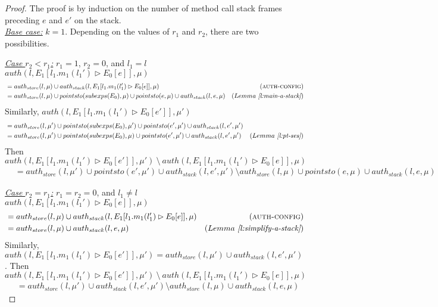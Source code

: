 \documentclass{llncs}
\begin{document}
\begin{proof} The proof is by induction on the number of method call stack frames preceding $e$ and $e'$ on the stack.\\

\noindent\underline{\underline{\textit{Base case:}}} $k = 1$. Depending on the values of $r_1$ and $r_2$, there are two possibilities.

\noindent\underline{\textit{Case $r_2 < r_1$:}} $r_1 = 1$, $r_2 = 0$, and $l_1 = l$\\
\noindent$auth(l, E_1[l_1.m_1(l_1') \rhd E_0[e]], \mu)$
\vspace{-7pt}
\begin{align*}
&= auth_{store}(l, \mu) \cup auth_{stack}(l, E_1[l_1.m_1(l_1') \rhd E_0[e]], \mu) & (\textsc{auth-config})\\
&= auth_{store}(l, \mu) \cup pointsto(subexps(E_0), \mu) \cup pointsto(e, \mu) \cup auth_{stack}(l, e, \mu) & (Lemma~\textit{\ref{l:main-a-stack}})
\end{align*}
Similarly,
\noindent$auth(l, E_1[l_1.m_1(l_1') \rhd E_0[e']], \mu')$
\vspace{-7pt}
\begin{align*}
&= auth_{store}(l, \mu') \cup pointsto(subexps(E_0), \mu') \cup pointsto(e', \mu') \cup auth_{stack}(l, e', \mu')\\
&= auth_{store}(l, \mu') \cup pointsto(subexps(E_0), \mu) \cup pointsto(e', \mu') \cup auth_{stack}(l, e', \mu') & (Lemma~\textit{\ref{l:pt-ses}})
\end{align*}
Then 
\noindent$auth(l, E_1[l_1.m_1(l_1') \rhd E_0[e']], \mu')~\setminus~auth(l, E_1[l_1.m_1(l_1') \rhd E_0[e]], \mu)$
\vspace{-7pt}
\begin{align*}
&= auth_{store}(l, \mu') \cup pointsto(e', \mu') \cup auth_{stack}(l, e', \mu') \setminus auth_{store}(l, \mu) \cup pointsto(e, \mu) \cup auth_{stack}(l, e, \mu)
\end{align*}


\noindent\underline{\textit{Case $r_2 = r_1$:}} $r_1 = r_2 = 0$, and $l_1 \neq l$\\
\noindent$auth(l, E_1[l_1.m_1(l_1') \rhd E_0[e]], \mu)$
\vspace{-7pt}
\begin{align*}
&= auth_{store}(l, \mu) \cup auth_{stack}(l, E_1[l_1.m_1(l_1') \rhd E_0[e]], \mu) & (\textsc{auth-config})\\
&= auth_{store}(l, \mu) \cup auth_{stack}(l, e, \mu) & (Lemma~\textit{\ref{l:simplify-a-stack}})
\end{align*}
Similarly,
\noindent$auth(l, E_1[l_1.m_1(l_1') \rhd E_0[e']], \mu') = auth_{store}(l, \mu') \cup auth_{stack}(l, e', \mu')$. Then\\
\noindent$auth(l, E_1[l_1.m_1(l_1') \rhd E_0[e']], \mu')~\setminus~auth(l, E_1[l_1.m_1(l_1') \rhd E_0[e]], \mu)$
\vspace{-7pt}
\begin{align*}
&= auth_{store}(l, \mu') \cup auth_{stack}(l, e', \mu') \setminus auth_{store}(l, \mu) \cup auth_{stack}(l, e, \mu)
\end{align*}


\end{proof}
\end{document}
